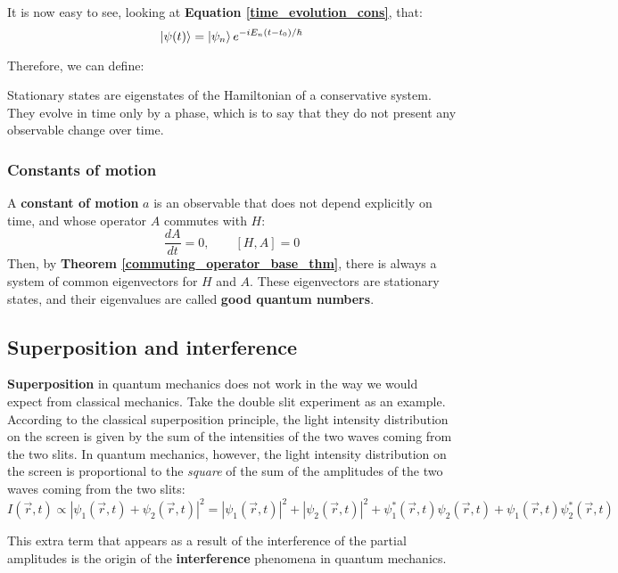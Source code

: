 It is now easy to see, looking at \textbf{Equation \ref{time_evolution_cons}}, that:
\begin{equation}
    \ket{\psi(t)} = \ket{\psi_n}e^{-iE_n(t-t_0)/\hbar}
\end{equation}

Therefore, we can define:

\begin{definition}
    Stationary states are eigenstates of the Hamiltonian of a conservative system. They evolve in time only by a phase, which is to say that they do not present any observable change over time.
\end{definition}

\subsubsection{Constants of motion}

A \textbf{constant of motion} $a$ is an observable that does not depend explicitly on time, and whose operator $A$ commutes with $H$:
\begin{equation}
    \frac{dA}{dt} = 0,\qquad [H,A] = 0
\end{equation}
Then, by \textbf{Theorem \ref{commuting_operator_base_thm}}, there is always a system of common eigenvectors for $H$ and $A$. These eigenvectors are stationary states, and their eigenvalues are called \textbf{good quantum numbers}.

\subsection{Superposition and interference}

\textbf{Superposition} in quantum mechanics does not work in the way we would expect from classical mechanics. Take the double slit experiment as an example. According to the classical superposition principle, the light intensity distribution on the screen is given by the sum of the intensities of the two waves coming from the two slits. In quantum mechanics, however, the light intensity distribution on the screen is proportional to the \textit{square} of the sum of the amplitudes of the two waves coming from the two slits:
\begin{equation}
    I(\vec{r}, t) \propto \left|\psi_1(\vec{r}, t) + \psi_2(\vec{r}, t)\right|^2 = \left|\psi_1(\vec{r}, t)\right|^2 + \left|\psi_2(\vec{r}, t)\right|^2 + \boxed{\psi_1^*(\vec{r}, t)\psi_2(\vec{r}, t) + \psi_1(\vec{r}, t)\psi_2^*(\vec{r}, t)}
\end{equation}

This extra term that appears as a result of the interference of the partial amplitudes is the origin of the \textbf{interference} phenomena in quantum mechanics.
